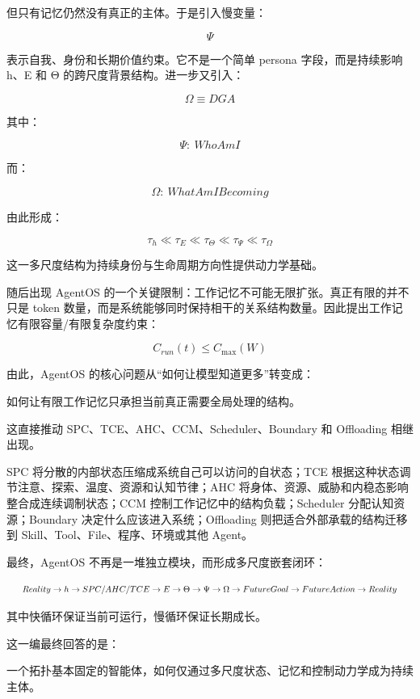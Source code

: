但只有记忆仍然没有真正的主体。于是引入慢变量：

$$
\Psi
$$

表示自我、身份和长期价值约束。它不是一个简单 persona 字段，而是持续影响 h、E 和 Θ 的跨尺度背景结构。进一步又引入：

$$
\Omega\equiv DGA
$$

其中：

$$
\Psi:\ WhoAmI
$$

而：

$$
\Omega:\ WhatAmIBecoming
$$

由此形成：

$$
\tau_h
\ll
\tau_E
\ll
\tau_\Theta
\ll
\tau_\Psi
\ll
\tau_\Omega
$$

这一多尺度结构为持续身份与生命周期方向性提供动力学基础。

随后出现 AgentOS 的一个关键限制：工作记忆不可能无限扩张。真正有限的并不只是 token 数量，而是系统能够同时保持相干的关系结构数量。因此提出工作记忆有限容量/有限复杂度约束：

$$
\boxed{
C_{run}(t)\leq C_{\max}(W)
}
$$

由此，AgentOS 的核心问题从“如何让模型知道更多”转变成：

\begin{statementbox}
如何让有限工作记忆只承担当前真正需要全局处理的结构。
\end{statementbox}

这直接推动 SPC、TCE、AHC、CCM、Scheduler、Boundary 和 Offloading 相继出现。

SPC 将分散的内部状态压缩成系统自己可以访问的自状态；TCE 根据这种状态调节注意、探索、温度、资源和认知节律；AHC 将身体、资源、威胁和内稳态影响整合成连续调制状态；CCM 控制工作记忆中的结构负载；Scheduler 分配认知资源；Boundary 决定什么应该进入系统；Offloading 则把适合外部承载的结构迁移到 Skill、Tool、File、程序、环境或其他 Agent。

最终，AgentOS 不再是一堆独立模块，而形成多尺度嵌套闭环：

$$
\resizebox{.96\linewidth}{!}{$\displaystyle
Reality
\rightarrow
h
\rightarrow
SPC/AHC/TCE
\rightarrow
E
\rightarrow
\Theta
\rightarrow
\Psi
\rightarrow
\Omega
\rightarrow
FutureGoal
\rightarrow
FutureAction
\rightarrow
Reality
$}
$$

其中快循环保证当前可运行，慢循环保证长期成长。

这一编最终回答的是：

\begin{statementbox}
一个拓扑基本固定的智能体，如何仅通过多尺度状态、记忆和控制动力学成为持续主体。
\end{statementbox}

